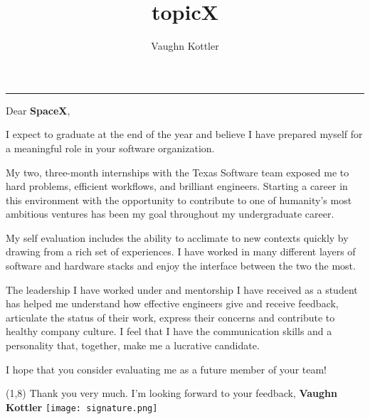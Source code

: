 \documentclass[letterpaper,12pt]{article}
\title{topicX}
\author{Vaughn Kottler}
\begin{document}
{\centering\noindent\rule{7.75in}{0.5pt}}\break\break
Dear {\color{maroon}\textbf{SpaceX}},

\vspace{1in}

\noindent\break
I expect to graduate at the end of the year and believe I have prepared
myself for a meaningful role in your software organization.

\noindent\break
My two, three-month internships with the Texas Software team exposed me to
hard problems, efficient workflows, and brilliant engineers. Starting a career
in this environment with the opportunity to contribute to one of humanity's
most ambitious ventures has been my goal throughout my undergraduate career.

\noindent\break
My self evaluation includes the ability to acclimate to new contexts quickly
by drawing from a rich set of experiences. I have worked in many different
layers of software and hardware stacks and enjoy the interface between the
two the most.

\noindent\break
The leadership I have worked under and mentorship I have received as a student
has helped me understand how effective engineers give and receive feedback,
articulate the status of their work, express their concerns and contribute
to healthy company culture. I feel that I have the communication skills and
a personality that, together, make me a lucrative candidate.

\noindent\break
I hope that you consider evaluating me as a future member of your team!

{\begin{textblock}{8}(1,8)\noindent
Thank you very much. I'm looking forward to your feedback,\break\break
{\color{maroon}\textbf{Vaughn Kottler}}\break\break\break
\texttt{[image: signature.png]}
\end{textblock}}
\end{document}
